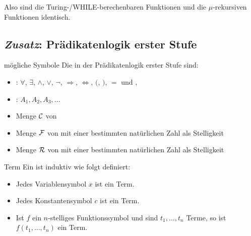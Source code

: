 \begin{Bem}
    Also sind die Turing-/WHILE-berechenbaren Funktionen und die $\mu$-rekursiven Funktionen
    identisch.
\end{Bem}

\pagebreak

\subsection{%
    \emph{Zusatz}:
    Prädikatenlogik erster Stufe%
}

\begin{Def}{mögliche Symbole}
    Die in der Prädikatenlogik erster Stufe  sind:
    \begin{itemize}
        \item
        : $\forall$, $\exists$, $\land$, $\lor$, $\lnot$, $\Rightarrow$,
        $\Leftrightarrow$, $($, $)$, $=$ und $,$
        
        \item
        : $A_1, A_2, A_3, \dotsc$
        
        \item
        Menge $\mathcal{C}$ von 
        
        \item
        Menge $\mathcal{F}$ von 
        mit einer bestimmten natürlichen Zahl als Stelligkeit
        
        \item
        Menge $\mathcal{R}$ von 
        mit einer bestimmten natürlichen Zahl als Stelligkeit
    \end{itemize}
\end{Def}

\linie

\begin{Def}{Term}
    Ein  ist induktiv wie folgt definiert:
    \begin{itemize}
        \item
        Jedes Variablensymbol $x$ ist ein Term.
        
        \item
        Jedes Konstantensymbol $c$ ist ein Term.
        
        \item
        Ist $f$ ein $n$-stelliges Funktionssymbol und sind $t_1, \dotsc, t_n$
        Terme, so ist $f(t_1, \dotsc, t_n)$ ein Term.
    \end{itemize}
\end{Def}

